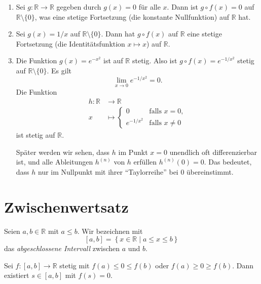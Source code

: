 \documentclass[../main.tex]{subfiles}
\begin{document}
\begin{examples}
  \leavevmode
  \begin{enumerate}[(1)]
    \item Sei $g \colon \mathbb{R} \to \mathbb{R}$ gegeben
      durch $g(x) = 0$ für alle $x$. Dann ist
      $g \circ f(x) = 0$ auf $\mathbb{R} \setminus \{0\}$,
      was eine stetige Fortsetzung (die konstante Nullfunktion)
      auf $\mathbb{R}$ hat.
    \item Sei $g(x) = 1/x$ auf $\mathbb{R} \setminus \{0\}$.
      Dann hat $g \circ f(x)$ auf $\mathbb{R}$ 
      eine stetige Fortsetzung (die Identitätsfunktion $x
      \mapsto x$) auf $\mathbb{R}$.
    \item Die Funktion $g(x) = e^{-x^2}$ ist auf $\mathbb{R}$ 
      stetig.
      Also ist $g \circ f(x) = e^{-1/x^2}$ stetig
      auf $\mathbb{R} \setminus \{0\}$.
      Es gilt
      \[
        \lim_{x \to 0}e^{-1/x^2} = 0.
      \]
      Die Funktion
      \begin{align*}
        h \colon \mathbb{R} & \to \mathbb{R} \\
        x & \mapsto 
        \begin{cases}
          0 & \text{falls } x = 0, \\
          e^{-1/x^2} & \text{falls } x \neq 0
        \end{cases}
      \end{align*}
      ist stetig auf $\mathbb{R}$.

      Später werden wir sehen,
      dass $h$ im Punkt $x = 0$ unendlich oft differenzierbar
      ist, und alle Ableitungen $h^{(n)}$ von $h$
      erfüllen $h^{(n)}(0) = 0$.
      Das bedeutet, dass $h$ nur im Nullpunkt
      mit ihrer ``Taylorreihe'' bei $0$
      übereinstimmt.
  \end{enumerate}
\end{examples}


\section{Zwischenwertsatz}

Seien $a, b \in \mathbb{R}$ mit $a \leq b$.
Wir bezeichnen mit
\[
  [a, b] = \left\{x \in \mathbb{R} \mid a \leq x \leq b\right\}
\]
das \emph{abgeschlossene Intervall} zwischen $a$ und $b$.

\begin{theorem}\label{thm:pre-zwischen}
  Sei $f \colon [a, b] \to \mathbb{R}$ stetig
  mit $f(a) \leq 0 \leq f(b)$ oder
  $f (a) \geq 0 \geq f(b)$. Dann existiert $s \in [a, b]$ 
  mit $f(s) = 0$.
\end{theorem}
\end{document}
